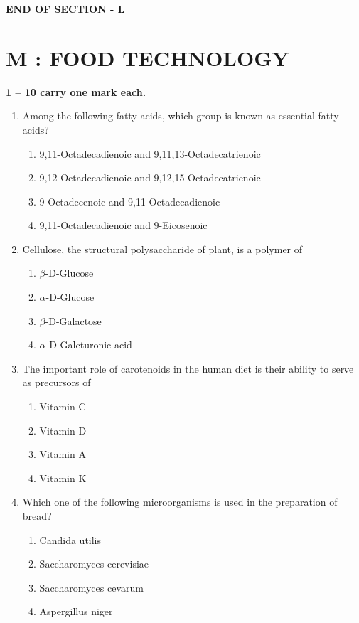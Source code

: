 \documentclass[journal,12pt,onecolumn]{IEEEtran}
\begin{document}
\begin{center}
\textbf{END OF SECTION - L}
\end{center}
\newpage
\section*{\centering M : FOOD TECHNOLOGY}
\noindent \textbf{ 1 --  10 carry one mark each.}
\begin{enumerate}[label=\arabic*.]

\item Among the following fatty acids, which group is known as essential fatty acids?
\begin{enumerate}[label=(\Alph*)]
\item 9,11-Octadecadienoic and 9,11,13-Octadecatrienoic
\item 9,12-Octadecadienoic and 9,12,15-Octadecatrienoic
\item 9-Octadecenoic and 9,11-Octadecadienoic
\item 9,11-Octadecadienoic and 9-Eicosenoic
\end{enumerate}

\item Cellulose, the structural polysaccharide of plant, is a polymer of
\begin{multicols}{2}
\begin{enumerate}[label=(\Alph*)]
\item $\beta$-D-Glucose
\item $\alpha$-D-Glucose
\item $\beta$-D-Galactose
\item $\alpha$-D-Galcturonic acid
\end{enumerate}
\end{multicols}

\item The important role of carotenoids in the human diet is their ability to serve as precursors of
\begin{multicols}{4}
\begin{enumerate}[label=(\Alph*)]
\item Vitamin C
\item Vitamin D
\item Vitamin A
\item Vitamin K
\end{enumerate}
\end{multicols}

\item Which one of the following microorganisms is used in the preparation of bread?
\begin{multicols}{2}
\begin{enumerate}[label=(\Alph*)]
\item Candida utilis
\item Saccharomyces cerevisiae
\item Saccharomyces cevarum
\item Aspergillus niger
\end{enumerate}
\end{multicols}


\end{enumerate}
\end{document}
